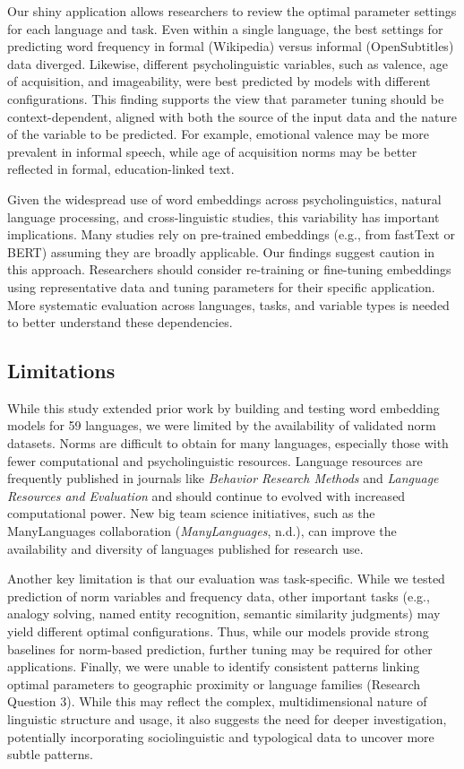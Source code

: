 \documentclass[
  man]{apa6}
\begin{document}
Our shiny application allows researchers to review the optimal parameter settings for each language and task. Even within a single language, the best settings for predicting word frequency in formal (Wikipedia) versus informal (OpenSubtitles) data diverged. Likewise, different psycholinguistic variables, such as valence, age of acquisition, and imageability, were best predicted by models with different configurations. This finding supports the view that parameter tuning should be context-dependent, aligned with both the source of the input data and the nature of the variable to be predicted. For example, emotional valence may be more prevalent in informal speech, while age of acquisition norms may be better reflected in formal, education-linked text.

Given the widespread use of word embeddings across psycholinguistics, natural language processing, and cross-linguistic studies, this variability has important implications. Many studies rely on pre-trained embeddings (e.g., from fastText or BERT) assuming they are broadly applicable. Our findings suggest caution in this approach. Researchers should consider re-training or fine-tuning embeddings using representative data and tuning parameters for their specific application. More systematic evaluation across languages, tasks, and variable types is needed to better understand these dependencies.

\subsection{Limitations}\label{limitations}

While this study extended prior work by building and testing word embedding models for 59 languages, we were limited by the availability of validated norm datasets. Norms are difficult to obtain for many languages, especially those with fewer computational and psycholinguistic resources. Language resources are frequently published in journals like \emph{Behavior Research Methods} and \emph{Language Resources and Evaluation} and should continue to evolved with increased computational power. New big team science initiatives, such as the ManyLanguages collaboration (\emph{ManyLanguages}, n.d.), can improve the availability and diversity of languages published for research use.

Another key limitation is that our evaluation was task-specific. While we tested prediction of norm variables and frequency data, other important tasks (e.g., analogy solving, named entity recognition, semantic similarity judgments) may yield different optimal configurations. Thus, while our models provide strong baselines for norm-based prediction, further tuning may be required for other applications. Finally, we were unable to identify consistent patterns linking optimal parameters to geographic proximity or language families (Research Question 3). While this may reflect the complex, multidimensional nature of linguistic structure and usage, it also suggests the need for deeper investigation, potentially incorporating sociolinguistic and typological data to uncover more subtle patterns.
\end{document}
